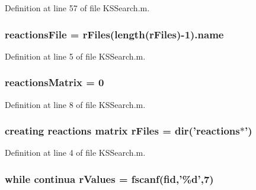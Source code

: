 Definition at line 57 of file K\+S\+Search.\+m.

\hypertarget{a00030_a4c72dba1fe2ee2fbcc699262a8d0c624}{
\subsubsection[{reactions\+File}]{\setlength{\rightskip}{0pt plus 5cm}reactions\+File = {\bf r\+Files}(length({\bf r\+Files})-\/1).{\bf name}}}\label{a00030_a4c72dba1fe2ee2fbcc699262a8d0c624}


Definition at line 5 of file K\+S\+Search.\+m.

\hypertarget{a00030_ac52097a2745fcef31eb175d2e9485845}{
\subsubsection[{reactions\+Matrix}]{\setlength{\rightskip}{0pt plus 5cm}reactions\+Matrix = 0}}\label{a00030_ac52097a2745fcef31eb175d2e9485845}


Definition at line 8 of file K\+S\+Search.\+m.

\hypertarget{a00030_ad75735665492cabd747370126464fddf}{
\subsubsection[{r\+Files}]{\setlength{\rightskip}{0pt plus 5cm}creating {\bf reactions} matrix r\+Files = {\bf dir}('{\bf reactions}$\ast$')}}\label{a00030_ad75735665492cabd747370126464fddf}


Definition at line 4 of file K\+S\+Search.\+m.

\hypertarget{a00030_a436a6968124e560649654a4abbd9dac6}{
\subsubsection[{r\+Values}]{\setlength{\rightskip}{0pt plus 5cm}while {\bf continua} r\+Values = {\bf fscanf}({\bf fid},'\%d',7)}}\label{a00030_a436a6968124e560649654a4abbd9dac6}


